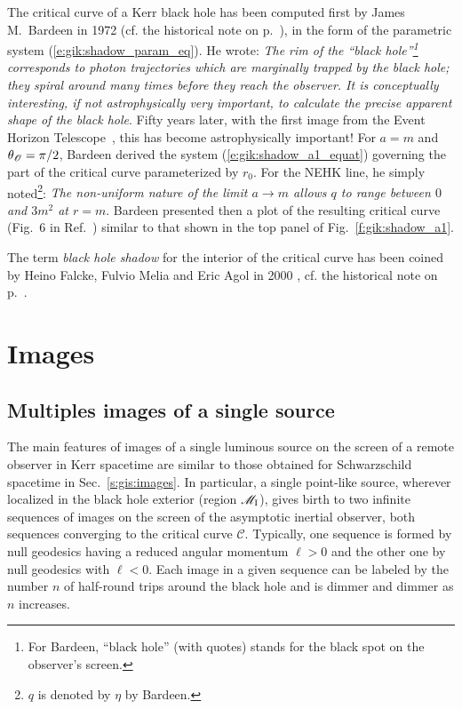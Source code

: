 \begin{hist}
The critical curve of a Kerr black hole has been computed
first by James M.~Bardeen in 1972 \cite{Barde73a}
(cf. the historical note on p.~\pageref{h:gis:bh_shadow}), in the form
of the parametric system (\ref{e:gik:shadow_param_eq}). He wrote:
\emph{The rim of the ``black hole''\footnote{For Bardeen, ``black hole''
(with quotes) stands for the black spot on the observer's screen.}
corresponds to photon trajectories which
are marginally trapped by the black hole; they spiral around many times before
they reach the observer. It is conceptually interesting, if not astrophysically
very important, to calculate the precise apparent shape of the black hole}.
Fifty years later, with the first image from the Event Horizon Telescope~\cite{EHT19a,Wielg_al20}, this has become astrophysically important!
For $a=m$ and $\theta_{\mathscr{O}}=\pi/2$, Bardeen derived the
system (\ref{e:gik:shadow_a1_equat}) governing the part of the critical
curve parameterized by $r_0$. For the NEHK line, he simply
noted\footnote{$q$ is denoted by $\eta$ by Bardeen.}: \emph{The non-uniform
nature of the limit $a\to m$ allows $q$ to range between
$0$ and $3m^2$ at $r=m$}.
Bardeen presented then
a plot of the resulting critical curve
(Fig.~6 in Ref.~\cite{Barde73a})
similar to that
shown in the top panel of Fig.~\ref{f:gik:shadow_a1}.

The term \emph{black hole shadow} for the interior of the critical curve
has been coined by Heino Falcke, Fulvio Melia and Eric Agol in 2000 \cite{FalckMA00}, cf. the historical note on p.~\pageref{h:gik:disk_images}.
\end{hist}



\section{Images} \label{s:gik:images}

\subsection{Multiples images of a single source}

The main features of images of a single luminous source on the screen of a remote observer in Kerr spacetime are similar to those obtained for Schwarzschild spacetime in Sec.~\ref{s:gis:images}.
In particular, a single point-like source, wherever localized in the black hole exterior (region $\mathscr{M}_{\rm I}$),
gives birth to two infinite sequences of images on the screen of the asymptotic inertial observer,
both sequences converging to the critical curve $\mathscr{C}$. Typically, one sequence is formed
by null geodesics having a reduced angular momentum
$\ell>0$ and the other one by null geodesics with $\ell < 0$.
Each image in a given sequence can be labeled by the number $n$ of half-round trips around the black hole and is dimmer and dimmer as $n$ increases.



